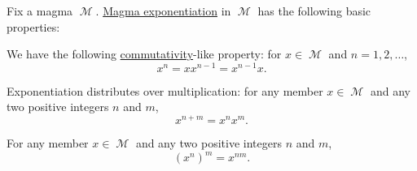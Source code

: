 \begin{proposition}\label{thm:magma_exponentiation_properties}
  Fix a magma \( \mscrM \). \hyperref[def:magma/exponentiation]{Magma exponentiation} in \( \mscrM \) has the following basic properties:

  \begin{thmenum}
     We have the following \hyperref[def:magma/commutative]{commutativity}-like property: for \( x \in \mscrM \) and \( n = 1, 2, \ldots \),
    \begin{equation}\label{eq:thm:magma_exponentiation_properties/commutativity}
      x^n = x x^{n-1} = x^{n-1} x.
    \end{equation}

     Exponentiation distributes over multiplication: for any member \( x \in \mscrM \) and any two positive integers \( n \) and \( m \),
    \begin{equation}\label{eq:thm:magma_exponentiation_properties/multiplication}
      x^{n + m} = x^n x^m.
    \end{equation}

     For any member \( x \in \mscrM \) and any two positive integers \( n \) and \( m \),
    \begin{equation}\label{eq:thm:magma_exponentiation_properties/repeated}
      (x^n)^m = x^{nm}.
    \end{equation}
  \end{thmenum}
\end{proposition}
